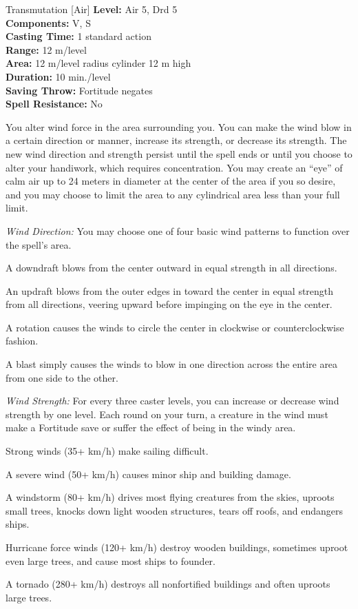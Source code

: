 {Transmutation [Air]}
{
	\textbf{Level:}
	Air 5, Drd 5\\
	\textbf{Components:}
	V, S\\
	\textbf{Casting Time:}
	1 standard action\\
	\textbf{Range:}
	12 m/level\\
	\textbf{Area:}
	12 m/level radius cylinder 12 m high\\
	\textbf{Duration:}
	10 min./level\\
	\textbf{Saving Throw:}
	Fortitude negates\\
	\textbf{Spell Resistance:}
	No\\
}
{
	You alter wind force in the area surrounding you. You can make the wind blow in a certain direction or manner, increase its strength, or decrease its strength. The new wind direction and strength persist until the spell ends or until you choose to alter your handiwork, which requires concentration. You may create an ``eye'' of calm air up to 24 meters in diameter at the center of the area if you so desire, and you may choose to limit the area to any cylindrical area less than your full limit.

	\textit{Wind Direction:}
	You may choose one of four basic wind patterns to function over the spell's area.

\begin{itemize*}
\item A downdraft blows from the center outward in equal strength in all directions.
\item An updraft blows from the outer edges in toward the center in equal strength from all directions, veering upward before impinging on the eye in the center.
\item A rotation causes the winds to circle the center in clockwise or counterclockwise fashion.
\item A blast simply causes the winds to blow in one direction across the entire area from one side to the other.
\end{itemize*}

	\textit{Wind Strength:}
	For every three caster levels, you can increase or decrease wind strength by one level. Each round on your turn, a creature in the wind must make a Fortitude save or suffer the effect of being in the windy area.

	Strong winds (35+ km/h) make sailing difficult.

	A severe wind (50+ km/h) causes minor ship and building damage.

	A windstorm (80+ km/h) drives most flying creatures from the skies, uproots small trees, knocks down light wooden structures, tears off roofs, and endangers ships.

	Hurricane force winds (120+ km/h) destroy wooden buildings, sometimes uproot even large trees, and cause most ships to founder.

	A tornado (280+ km/h) destroys all nonfortified buildings and often uproots large trees.

}
